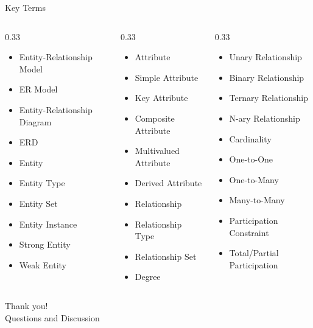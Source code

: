 \documentclass[aspectratio=169,11pt]{beamer}
\newcommand{\smallitem}{\setlength{\itemsep}{2pt}\setlength{\parskip}{0pt}}
\begin{document}
\begin{frame}{Key Terms}
\scriptsize
\begin{columns}[T]
\begin{column}{0.33\textwidth}
\begin{itemize}
\smallitem
  \item Entity-Relationship Model
  \item ER Model
  \item Entity-Relationship Diagram
  \item ERD
  \item Entity
  \item Entity Type
  \item Entity Set
  \item Entity Instance
  \item Strong Entity
  \item Weak Entity
\end{itemize}
\end{column}
\begin{column}{0.33\textwidth}
\begin{itemize}
\smallitem
  \item Attribute
  \item Simple Attribute
  \item Key Attribute
  \item Composite Attribute
  \item Multivalued Attribute
  \item Derived Attribute
  \item Relationship
  \item Relationship Type
  \item Relationship Set
  \item Degree
\end{itemize}
\end{column}
\begin{column}{0.33\textwidth}
\begin{itemize}
\smallitem
  \item Unary Relationship
  \item Binary Relationship
  \item Ternary Relationship
  \item N-ary Relationship
  \item Cardinality
  \item One-to-One
  \item One-to-Many
  \item Many-to-Many
  \item Participation Constraint
  \item Total/Partial Participation
\end{itemize}
\end{column}
\end{columns}
\end{frame}

\begin{frame}
\centering
\Huge Thank you!\\[0.5cm]
\Large Questions and Discussion
\end{frame}
\end{document}
